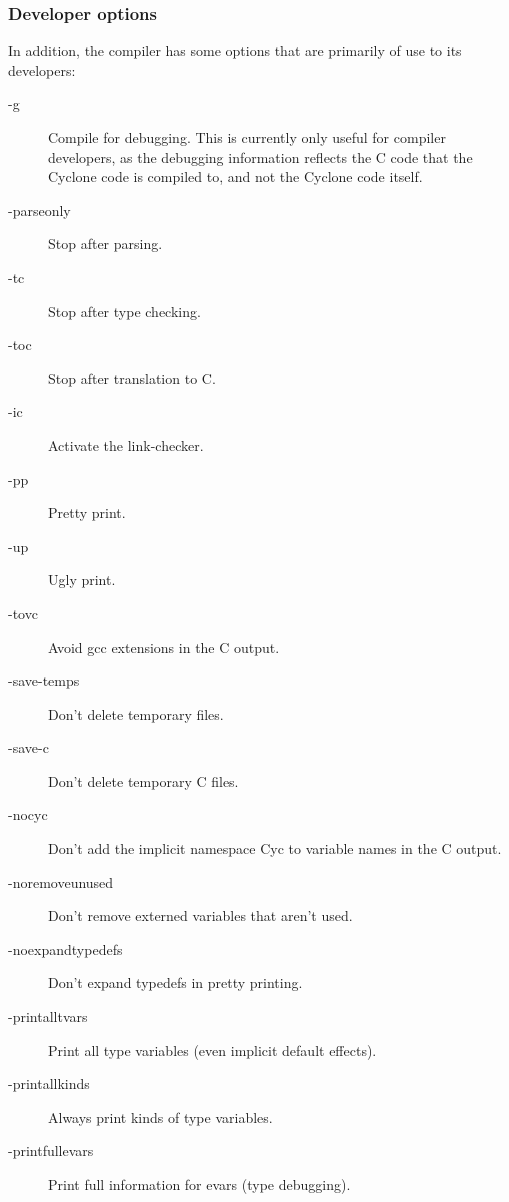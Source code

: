 \subsubsection*{Developer options}

In addition, the compiler has some options that are primarily of use
to its developers:
\begin{description}
\item[-g]
  Compile for debugging.  This is currently only useful for compiler
  developers, as the debugging information reflects the C code that
  the Cyclone code is compiled to, and not the Cyclone code itself.
\item[-parseonly]
  Stop after parsing.
\item[-tc]
  Stop after type checking.
\item[-toc]
  Stop after translation to C\@.
\item[-ic]
  Activate the link-checker.
\item[-pp]
  Pretty print.
\item[-up]
  Ugly print.
\item[-tovc]
  Avoid gcc extensions in the C output.
\item[-save-temps]
  Don't delete temporary files.
\item[-save-c]
  Don't delete temporary C files.
\item[-nocyc]
  Don't add the implicit namespace Cyc to variable names in the C output.
\item[-noremoveunused]
  Don't remove externed variables that aren't used.
\item[-noexpandtypedefs]
  Don't expand typedefs in pretty printing.
\item[-printalltvars]
  Print all type variables (even implicit default effects).
\item[-printallkinds]
  Always print kinds of type variables.
\item[-printfullevars]
  Print full information for evars (type debugging).
\end{description}

